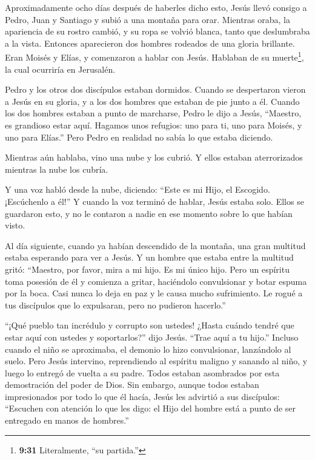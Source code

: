  Aproximadamente ocho días después de haberles dicho esto,
Jesús llevó consigo a Pedro, Juan y Santiago y subió a una montaña para
orar.  Mientras oraba, la apariencia de su rostro cambió, y
su ropa se volvió blanca, tanto que deslumbraba a la vista.
 Entonces aparecieron dos hombres rodeados de una gloria
brillante. Eran Moisés y Elías, y comenzaron a hablar con Jesús.
 Hablaban de su muerte\footnote{\textbf{9:31} Literalmente,
  ``su partida.''}, la cual ocurriría en Jerusalén.

 Pedro y los otros dos discípulos estaban dormidos. Cuando
se despertaron vieron a Jesús en su gloria, y a los dos hombres que
estaban de pie junto a él.  Cuando los dos hombres estaban
a punto de marcharse, Pedro le dijo a Jesús, ``Maestro, es grandioso
estar aquí. Hagamos unos refugios: uno para ti, uno para Moisés, y uno
para Elías.'' Pero Pedro en realidad no sabía lo que estaba diciendo.

 Mientras aún hablaba, vino una nube y los cubrió. Y ellos
estaban aterrorizados mientras la nube los cubría.

 Y una voz habló desde la nube, diciendo: ``Este es mi
Hijo, el Escogido. ¡Escúchenlo a él!''  Y cuando la voz
terminó de hablar, Jesús estaba solo. Ellos se guardaron esto, y no le
contaron a nadie en ese momento sobre lo que habían visto.

 Al día siguiente, cuando ya habían descendido de la
montaña, una gran multitud estaba esperando para ver a Jesús.
 Y un hombre que estaba entre la multitud gritó: ``Maestro,
por favor, mira a mi hijo. Es mi único hijo.  Pero un
espíritu toma posesión de él y comienza a gritar, haciéndolo
convulsionar y botar espuma por la boca. Casi nunca lo deja en paz y le
causa mucho sufrimiento.  Le rogué a tus discípulos que lo
expulsaran, pero no pudieron hacerlo.''

 ``¡Qué pueblo tan incrédulo y corrupto son ustedes! ¿Hasta
cuándo tendré que estar aquí con ustedes y soportarlos?'' dijo Jesús.
``Trae aquí a tu hijo.''  Incluso cuando el niño se
aproximaba, el demonio lo hizo convulsionar, lanzándolo al suelo. Pero
Jesús intervino, reprendiendo al espíritu maligno y sanando al niño, y
luego lo entregó de vuelta a su padre.  Todos estaban
asombrados por esta demostración del poder de Dios. Sin embargo, aunque
todos estaban impresionados por todo lo que él hacía, Jesús les advirtió
a sus discípulos:  ``Escuchen con atención lo que les digo:
el Hijo del hombre está a punto de ser entregado en manos de hombres.''

